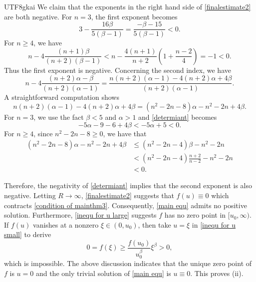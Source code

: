 \documentclass[reqno,12pt]{amsart}
\numberwithin{equation}{section}
\begin{document}
\begin{CJK}{UTF8}{gkai}
  We claim that the exponents in the right hand side of \eqref{finalestimate2} are both negative. For $n=3$, the first exponent becomes
  \begin{equation*}
  	3-\frac{16\beta}{5(\beta-1)}=\frac{-\beta-15}{5(\beta-1)}<0.
  \end{equation*}
  For $n\ge 4$, we have
  \begin{equation*}
  	n-4\frac{(n+1)\beta}{(n+2)(\beta-1)}< n-\frac{4(n+1)}{n+2}\left(1+\frac{n-2}{4}\right)=-1<0.
  \end{equation*}
  Thus the first exponent is negative. Concerning the second index, we have
  \begin{equation*}
  	n-4\frac{(n+2)\alpha-\beta}{(n+2)(\alpha-1)}=\frac{n(n+2)(\alpha-1)-4(n+2)\alpha+4\beta}{(n+2)(\alpha-1)}.
  \end{equation*}
  A straightforward computation shows
  \begin{equation}\label{determiant}
  	n(n+2)(\alpha-1)-4(n+2)\alpha+4\beta=(n^{2}-2n-8)\alpha-n^{2}-2n+4\beta.
  \end{equation}
  For $n=3$, we use the fact $\beta<5$ and $\alpha>1$ and \eqref{determiant} becomes
  \begin{equation*}
  	 -5\alpha-9-6+4\beta<-5\alpha+5<0.
  \end{equation*}
  For  $n\ge 4$, since $n^{2}-2n-8\ge 0$, we have that
  \begin{align*}
  	(n^{2}-2n-8)\alpha-n^{2}-2n+4\beta&\le (n^{2}-2n-4)\beta-n^{2}-2n \\
  	&<  (n^{2}-2n-4)\frac{n+2}{n-2}-n^{2}-2n\\
  	&<0.
  \end{align*}  
  
   Therefore, the negativity of \eqref{determiant} implies that the second exponent is also negative. Letting $R\to \infty$, \eqref{finalestimate2}
   suggests that $f(u)\equiv 0$ which contracts \eqref{condition of mainthm3}.
   Consequently, \eqref{main equ} admits no positive solution. Furthermore, \eqref{inequ for u large} suggests $f$ has no zero point in $[u_{0},\infty)$. If $f(u)$  vanishes at a nonzero  $\xi\in (0,u_0)$,
    then take $u=\xi$ in \eqref{inequ for u small} to derive
    $$  0=f(\xi)\ge \frac{f(u_{0})}{u_{0}^{\beta}}\xi^{\beta}>0,$$
   which is impossible. The above discussion indicates that the unique zero point of $f$ is $u=0$ and the only trivial solution of \eqref{main equ} is $u\equiv 0$. This proves (ii).
  

\end{CJK}
\end{document}
